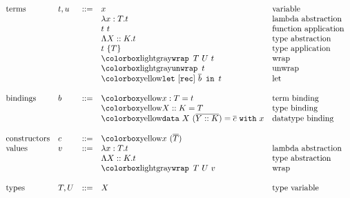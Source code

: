 \begin{figure}[!t]
  \centering
  \begin{displaymath}
  \begin{array}{lllll}
  \textrm{terms}    & t, u   & ::= & x                           & \textrm{variable}\\
                    &        &     & \lambda x:T.t               & \textrm{lambda abstraction}\\
                    &        &     & t ~ t                       & \textrm{function application} \\
                    &        &     & \Lambda X :: K . t          & \textrm{type abstraction}\\
                    &        &     & t~\{T\}                      & \textrm{type application}\\
                    &        &     & \fomfDiff{\wrap ~ T ~ U ~ t} & \textrm{wrap}\\
                    &        &     & \fomfDiff{\unwrap ~ t}        & \textrm{unwrap}\\
                    &        &     & \firDiff{\tlet ~ [\rec] ~ \seq{b} ~ \tin ~ t} & \textrm{let}\\
                    &        &     &                             &   \\
  \textrm{bindings} & b      & ::= & \firDiff{x : T = t}         & \textrm{term binding}   \\
                    &        &     & \firDiff{X :: K = T}        & \textrm{type binding}\\
                    &        &     & \firDiff{\datatype{X}{(\seq{Y :: K})}{x}{\seq{c}}} & \textrm{datatype binding}  \\
                    &        &     &                             &   \\
  \textrm{constructors} & c  & ::= & \firDiff{x~(\seq{T})}       & \\
  \textrm{values}   & v      & ::= & \lambda x:T.t               & \textrm{lambda abstraction }   \\
                    &        &     & \Lambda X :: K.t            & \textrm{type abstraction}\\
                    &        &     & \fomfDiff{\wrap ~ T ~ U ~v} & \textrm{wrap}\\
                    &        &     &                             &   \\
  \textrm{types}    & T,U    & ::= & X                           & \textrm{type variable}\\

\end{array}
\end{displaymath}
\end{figure}
